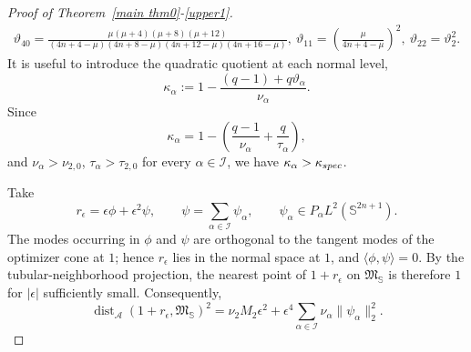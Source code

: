 \documentclass[10pt,a4paper]{amsart}
\begin{document}
\begin{proof}[Proof of Theorem~\ref{main thm0}-\eqref{upper1}]
\begin{equation*}
\begin{aligned}
 \vartheta_{40}=\frac{\mu(\mu+4)(\mu+8)(\mu+12)}{(4n+4-\mu)(4n+8-\mu)(4n+12-\mu)(4n+16-\mu)},\
 \vartheta_{11}=\left(\frac\mu{4n+4-\mu}\right)^2,\
 \vartheta_{22}=\vartheta_2^2.
\end{aligned}
\end{equation*}
It is useful to introduce the quadratic quotient at each normal level,
\begin{equation*}
 \kappa_\alpha:=1-\frac{(q-1)+q\vartheta_\alpha}{\nu_\alpha}.
\end{equation*}
{Since
\[
\kappa_\alpha=1-\left(\frac{q-1}{\nu_\alpha}+\frac{q}{\tau_\alpha}\right),
\]
and} \(\nu_\alpha>\nu_{2,0}\), \(\tau_\alpha>\tau_{2,0}\) for every \(\alpha\in\mathcal I\), we have $\kappa_\alpha>\kappa_{\rm spec}$.


Take
\begin{equation*}
 r_\epsilon=\epsilon\phi+\epsilon^2\psi,\qquad
 \psi=\sum_{\alpha\in\mathcal I}\psi_\alpha,\qquad
 \psi_\alpha\in P_\alpha L^2(\mathbb S^{2n+1}).
\end{equation*}
{The modes occurring in $\phi$ and $\psi$ are orthogonal to the tangent modes of the optimizer cone at $1$; hence $r_\epsilon$ lies in the normal space at $1$, and $\langle\phi,\psi\rangle=0$. By the tubular-neighborhood projection, the nearest point of $1+r_\epsilon$ on $\mathfrak M_{\mathbb S}$ is therefore $1$ for $|\epsilon|$ sufficiently small. Consequently,}
\begin{equation}\label{exact-distance-fourth}
 \operatorname{dist}_{\mathscr A}(1+r_\epsilon,\mathfrak M_{\mathbb S})^2
 =\nu_2M_2\epsilon^2+\epsilon^4\sum_{\alpha\in\mathcal I}\nu_\alpha\|\psi_\alpha\|_2^2.
\end{equation}


\end{proof}
\end{document}
